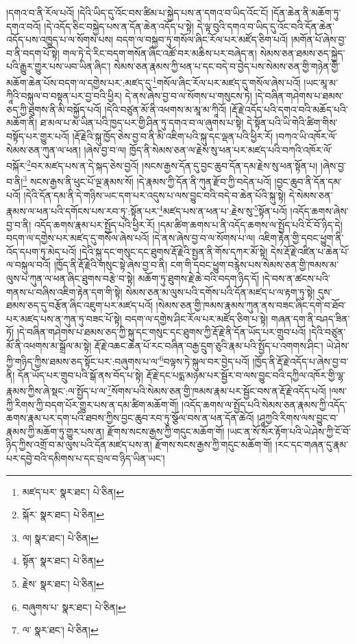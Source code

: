 །དགའ་བ་ནི་རོལ་པའོ། །དེའི་ཡིད་དུ་འོང་བས་ཚིམ་པ་སྐྱེད་པས་ན་དགའ་བ་ཡིད་འོང་ངོ། །དོན་ཆེན་ནི་མཆོག་ཏུ་དགའ་བའོ། །དེ་འདོད་ཅིང་བསྐྱེད་པས་ན་དོན་ཆེན་འདོད་པ་སྟེ། དེ་ལྟ་བུའི་དགའ་བ་ཡིད་དུ་འོང་བའི་དོན་ཆེན་འདོད་པས་འཁྱུད་པ་ལ་སོགས་པས། བདག་ལ་བསྐྱབ་ཏུ་གསོལ་ཞིང་རོལ་པར་མཛོད་ཅིག་པའོ། །མགོན་པོ་ཞེས་བྱ་བ་ནི་བདག་པོ་སྟེ། གལ་ཏེ་དེ་རིང་བདག་གསོན་ཞིང་འཚོ་བར་མཆིས་པར་བཞེད་ན། སེམས་ཅན་ཐམས་ཅད་སྐྱེད་པའི་རྒྱུར་གྱུར་པས་ཡབ་ཡིན་ཞིང་། སེམས་ཅན་རྣམས་ཀྱི་ཕན་པ་དང་བདེ་བ་བྱེད་པས་སེམས་ཅན་གྱི་གཉེན་གྱི་མཆོག་ཆེན་པོས་བདག་ལ་དགྱེས་པར་:མཛད་དུ་\footnote{མཛད་པར་  སྣར་ཐང་།  པེ་ཅིན། }གསོལ་ཞིང་རོལ་པར་མཛད་དུ་གསོལ་ཞེས་པའོ། །ཡང་མཱ་མ་ཀཱིའི་བསྐུལ་བ་བསྟན་པར་བྱ་བའི་ཕྱིར། དེ་ནས་ཞེས་བྱ་བ་ལ་སོགས་པ་གསུངས་ཏེ། །དེ་བཞིན་གཤེགས་པ་ཐམས་ཅད་ཀྱི་ཐུགས་ནི་མི་བསྐྱོད་པའོ། །དེའི་བཙུན་མོ་ནི་འཕགས་མ་མཱ་མ་ཀཱིའོ། །རྡོ་རྗེ་འདོད་པའི་དགའ་བའི་མཆོད་པའི་མཆོག་ནི། ཐ་མལ་པ་མ་ཡིན་པའི་ཁྱད་པར་གྱི་ཤིན་ཏུ་དགའ་བ་ལ་ཞུགས་པ་སྟེ། དེ་སྟོན་པའི་ཡི་གེའི་ཚིག་གིས་བསྟོད་པར་གྱུར་པའོ། །རྡོ་རྗེའི་སྐུ་ཁྱོད་ཅེས་བྱ་བ་ནི་མི་འཇིག་པའི་སྐུ་དང་ལྡན་པའི་ཕྱིར་རོ། །བཀའ་ཡི་འཁོར་ལོ་སེམས་ཅན་ཀུན་ལ་ཕན། །ཞེས་བྱ་བ་ལ། ཁྱོད་ནི་སེམས་ཅན་ལ་རྗེས་སུ་ཕན་པར་མཛད་པའི་བཀའི་འཁོར་ལོ་བསྐོར་\footnote{སྐོར་  སྣར་ཐང་།  པེ་ཅིན། }བར་མཛད་པས་ན་དེ་སྐད་ཅེས་བྱའོ། །སངས་རྒྱས་དོན་དུ་བྱང་ཆུབ་དོན་དམ་རྗེས་སུ་ཕན་སྟོན་པ། །ཞེས་བྱ་བ་ནི།\footnote{ལ།  སྣར་ཐང་།  པེ་ཅིན། } སངས་རྒྱས་ནི་ཕུང་པོ་ལྔ་རྣམས་སོ། །དེ་རྣམས་ཀྱི་དོན་ནི་ཀུན་རྫོབ་ཀྱི་བདེན་པའོ། །བྱང་ཆུབ་ནི་དོན་དམ་པའོ། །དེའི་དོན་དམ་ནི་དེ་གཉིས་ཡང་དག་པར་འདུས་པ་ལས་བྱུང་བའི་བདེ་བ་ཆེན་པོའི་སྐུ་སྟེ། དེ་སེམས་ཅན་རྣམས་ལ་ཕན་པའི་དགོངས་པས་རབ་ཏུ་:སྟོན་པར་\footnote{སྟོན་  སྣར་ཐང་།  པེ་ཅིན། }མཛད་པས་ན་ཕན་པ་:རྗེས་སུ་\footnote{རྗེས་  སྣར་ཐང་།  པེ་ཅིན། }སྟོན་པའོ། །འདོད་ཆགས་ཞེས་བྱ་བ་ནི། འདོད་ཆགས་རྣམ་པར་སྤྱོད་པའི་ཕྱིར་རོ། །དམ་ཚིག་ཆགས་པ་ནི་འདོད་ཆགས་ལ་སྤྱོད་པའི་ངོ་བོ་ཉིད་དེ། བདག་ལ་དགྱེས་པར་མཛད་དུ་གསོལ་ཞེས་པའོ། །དེ་ནས་ཞེས་བྱ་བ་ལ་སོགས་པ་ལ། འཇིག་རྟེན་གྱི་དབང་ཕྱུག་ནི་འོད་དཔག་ཏུ་མེད་པའོ། །དེའི་སྐུ་དང་གསུང་དང་ཐུགས་རྡོ་རྗེའི་སྤྱན་ནི་གོས་དཀར་མོ་སྟེ། དེས་རྡོ་རྗེ་འཛིན་པ་ཆེན་པོ་ལ་བསྐུལ་བའོ། །ཁྱོད་ནི་རྡོ་རྗེའི་གསུང་སྟེ་ཞེས་བྱ་བ་ནི། ངག་གི་དབང་ཕྱུག་བརྙེས་པས་སེམས་ཅན་གྱི་ཁམས་མ་ལུས་པ་ཀུན་ལ་ཕན་ཞིང་ཐུགས་བརྩེ་བ་སྟེ། མཆོག་ཏུ་ཐུགས་རྗེ་ཆེ་བའི་བདག་ཉིད་དོ། །དེ་བས་ན་ཚངས་པའི་གནས་པ་བཞིས་འཇིག་རྟེན་དག་གི་སྟེ། སེམས་ཅན་མ་ལུས་པའི་དགོས་པའི་དོན་མཛད་པ་ལ་རྟག་ཏུ་སྟེ། དུས་ཐམས་ཅད་དུ་བརྩོན་ཞིང་འཇུག་པར་མཛད་པའོ། །སེམས་ཅན་གྱི་ཁམས་རྣམས་ཀུན་ནས་བཟང་ཞིང་དགེ་བ་ཐོབ་པར་མཛད་པས་ན་ཀུན་ཏུ་བཟང་པོ་སྟེ། བདག་ལ་དགྱེས་ཤིང་རོལ་པར་མཛོད་ཅིག་པ་སྟེ། གཞན་དག་ནི་བཤད་ཟིན་ཏོ། །དེ་བཞིན་གཤེགས་པ་ཐམས་ཅད་ཀྱི་སྐུ་དང་གསུང་དང་ཐུགས་ཀྱི་རྡོ་རྗེ་ནི་དོན་ཡོད་པར་གྲུབ་པའོ། །དེའི་བཙུན་མོ་ནི་འཕགས་མ་སྒྲོལ་མ་སྟེ། རྡོ་རྗེ་འཆང་ཆེན་པོ་རང་བཞིན་བརྒྱ་དྲུག་ཅུའི་རྣམ་པའི་སྤྱོད་པ་འགགས་ཤིང་། ཡེ་ཤེས་ཀྱི་གཉིད་ཀྱིས་ཐམས་ཅད་སྟོང་པར་:བཞུགས་པ་ལ་\footnote{བཞུགས་པ་  སྣར་ཐང་།  པེ་ཅིན། }བལྟས་ཏེ་སྐུལ་བར་བྱེད་པའོ། །ཁྱོད་ནི་རྡོ་རྗེ་འདོད་པ་ཞེས་བྱ་བ་ནི། དོན་ཡོད་པར་གྲུབ་པའི་སྒོ་ནས་བོད་པ་སྟེ། རྡོ་རྗེ་དང་པདྨ་མཉམ་པར་སྦྱོར་བ་ལས་བྱུང་བའི་དཀྱིལ་འཁོར་གྱི་ལྷ་རྣམས་ཀྱིས་ཞེ་སྡང་:ལ་སྤྱོད་པ་ལ་\footnote{ལ་  སྣར་ཐང་།  པེ་ཅིན། }སོགས་པའི་སེམས་ཅན་གྱི་ཁམས་རྣམ་པར་སྦྱོང་བས་ན་རྡོ་རྗེ་འདོད་པའོ། །ལས་ཀྱི་རིགས་ཀྱི་བདག་པོར་གྱུར་པས་ན་དམ་ཚིག་མཆོག་གོ། །འདོད་ཆགས་ལ་སྤྱོད་པའི་སེམས་ཅན་རྣམས་ཀྱི་འདོད་ཆགས་རྣམ་པར་དག་པའི་ཐབས་ཀྱིས་བྱང་ཆུབ་རབ་ཏུ་སྩོལ་བས་ན་ཕན་དོན་ཆེའོ། །ཤཱཀྱའི་རིགས་ལས་བྱུང་བ་རྣམས་ཀྱི་མཆོག་ཏུ་གྱུར་པས་ན། རྫོགས་སངས་རྒྱས་ཀྱི་གདུང་མཆོག་གོ། །ཡང་ན་སོ་སོར་རྟོག་པའི་ཡེ་ཤེས་ཀྱི་ངོ་བོ་ཉིད་ཀྱིས་འགྲོ་བ་མ་ལུས་པའི་དོན་མཛད་པས་ན། རྫོགས་སངས་རྒྱས་ཀྱི་གདུང་མཆོག་གོ། །རང་དང་གཞན་དུ་རྣམ་པར་དབྱེ་བའི་དམིགས་པ་དང་བྲལ་བ་ཉིད་ཡིན་ཡང་། 